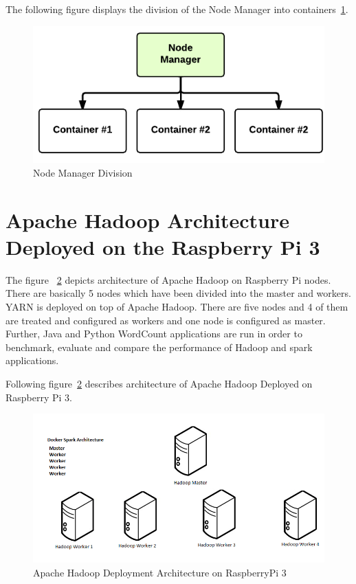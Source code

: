 The following figure displays the division of the Node Manager into 
containers~\ref{s:archinode}.

\begin{figure}[!ht]
\centering\includegraphics[width=\textwidth]{images/nodemanager.png}
\caption{Node 
Manager 
Division~\cite{hid-sp18-412-YARN_Hadoop_Internal}}\label{s:archinode}
\end{figure}

\section{Apache Hadoop Architecture Deployed on the Raspberry Pi 3}

The figure ~\ref{s:archihadoop} depicts 
architecture of Apache Hadoop on 
Raspberry Pi nodes. There are basically 5 nodes which have been 
divided into the master and workers. 
YARN is deployed on top of Apache Hadoop. 
There are five nodes and 4 of them are treated and 
configured as workers and one node is configured as 
master. Further, Java and Python WordCount applications are run 
in order to benchmark, evaluate and compare the performance
 of Hadoop and spark applications.

Following figure~\ref{s:archihadoop} describes architecture of Apache 
Hadoop Deployed on Raspberry Pi 3.

\begin{figure}[!ht]
\centering\includegraphics[width=\textwidth]{images/RaspberryPiSpark.png}
\caption{Apache Hadoop Deployment Architecture on 
RaspberryPi 3}\label{s:archihadoop}
\end{figure}

